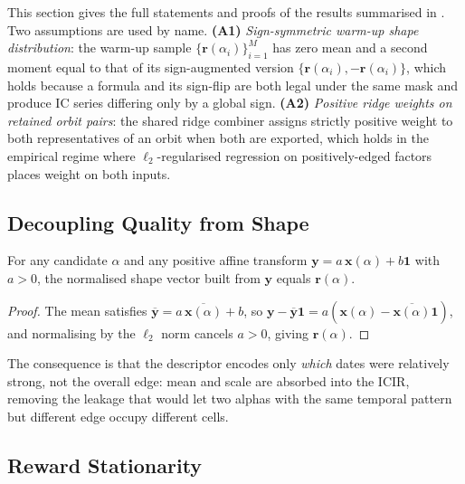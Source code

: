 This section gives the full statements and proofs of the results summarised in . Two assumptions are used by name. \textbf{(A1)} \emph{Sign-symmetric warm-up shape distribution}: the warm-up sample $\{\mathbf{r}(\alpha_i)\}_{i=1}^M$ has zero mean and a second moment equal to that of its sign-augmented version $\{\mathbf{r}(\alpha_i),-\mathbf{r}(\alpha_i)\}$, which holds because a formula and its sign-flip are both legal under the same mask and produce IC series differing only by a global sign. \textbf{(A2)} \emph{Positive ridge weights on retained orbit pairs}: the shared ridge combiner assigns strictly positive weight to both representatives of an orbit when both are exported, which holds in the empirical regime where $\ell_2$-regularised regression on positively-edged factors places weight on both inputs.

\subsection{Decoupling Quality from Shape}
\label{app:alphaqd_decouple}

\begin{lemma}
\label{app:lem_affine}
For any candidate $\alpha$ and any positive affine transform $\mathbf{y}=a\,\mathbf{x}(\alpha)+b\mathbf{1}$ with $a>0$, the normalised shape vector built from $\mathbf{y}$ equals $\mathbf{r}(\alpha)$.
\end{lemma}
\begin{proof}
The mean satisfies $\overline{\mathbf{y}}=a\,\overline{\mathbf{x}(\alpha)}+b$, so $\mathbf{y}-\overline{\mathbf{y}}\mathbf{1}=a(\mathbf{x}(\alpha)-\overline{\mathbf{x}(\alpha)}\mathbf{1})$, and normalising by the $\ell_2$ norm cancels $a>0$, giving $\mathbf{r}(\alpha)$.
\end{proof}

The consequence is that the descriptor encodes only \emph{which} dates were relatively strong, not the overall edge: mean and scale are absorbed into the ICIR, removing the leakage that would let two alphas with the same temporal pattern but different edge occupy different cells.

\subsection{Reward Stationarity}
\label{app:alphaqd_stationary}

